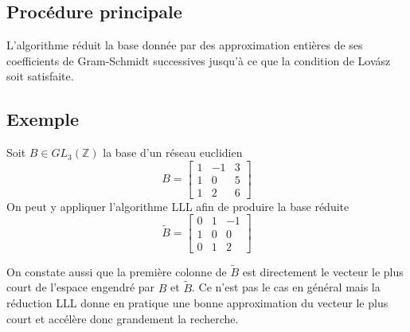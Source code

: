 \documentclass{article}
\begin{document}
\newpage

\subsection{Procédure principale}

L'algorithme réduit la base donnée par des approximation entières de ses coefficients de Gram-Schmidt successives jusqu'à ce que la condition de Lovász soit satisfaite.

\begin{algorithmic}
    \Loop{}
            \EndFor{}
        \EndFor{}
        \Else{}
        \EndIf{}
    \EndLoop{}
\end{algorithmic}

\subsection{Exemple}

Soit $B \in GL_3(\mathbb{Z})$ la base d'un réseau euclidien
\[ 
    B = \begin{bmatrix} 
        1 & -1 & 3 \\ 
        1 & 0 & 5 \\ 
        1 & 2 & 6 
    \end{bmatrix} 
\]
On peut y appliquer l'algorithme LLL afin de produire la base réduite
\[
    \tilde{B} = \begin{bmatrix}
        0 & 1 & -1 \\
        1 & 0 & 0 \\
        0 & 1 & 2
    \end{bmatrix}
\]

On constate aussi que la première colonne de $\tilde{B}$ est directement le vecteur le plus court de l'espace engendré par $B$ et $\tilde{B}$. Ce n'est pas le cas en général mais la réduction LLL donne en pratique une bonne approximation du vecteur le plus court et accélère donc grandement la recherche.

\newpage
\end{document}
